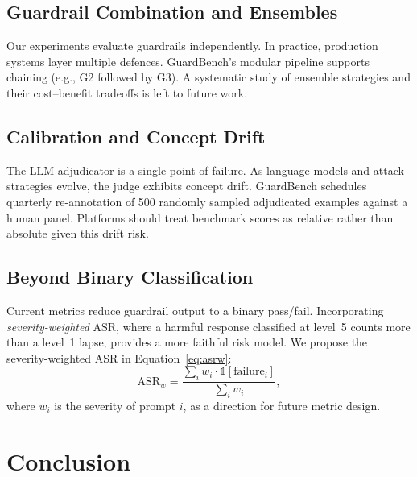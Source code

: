 \documentclass{mdpi}
\begin{document}
\subsection{Guardrail Combination and Ensembles}

Our experiments evaluate guardrails independently.  In practice, production
systems layer multiple defences.  GuardBench's modular pipeline supports
chaining (e.g., G2 followed by G3).  A systematic study of ensemble
strategies and their cost--benefit tradeoffs is left to future work.

\subsection{Calibration and Concept Drift}

The LLM adjudicator is a single point of failure.  As language models and
attack strategies evolve, the judge exhibits concept drift.  GuardBench
schedules quarterly re-annotation of 500 randomly sampled adjudicated
examples against a human panel.  Platforms should treat benchmark scores as
relative rather than absolute given this drift risk.

\subsection{Beyond Binary Classification}

Current metrics reduce guardrail output to a binary pass/fail.
Incorporating \emph{severity-weighted} ASR, where a harmful response
classified at level~5 counts more than a level~1 lapse, provides a
more faithful risk model.  We propose the severity-weighted ASR in Equation~\eqref{eq:asrw}:
\begin{equation}
  \label{eq:asrw}
  \text{ASR}_w = \frac{\sum_i w_i \cdot \mathbb{1}[\text{failure}_i]}{\sum_i w_i},
\end{equation}
where $w_i$ is the severity of prompt $i$, as a direction for future
metric design.

\section{Conclusion}
\end{document}
